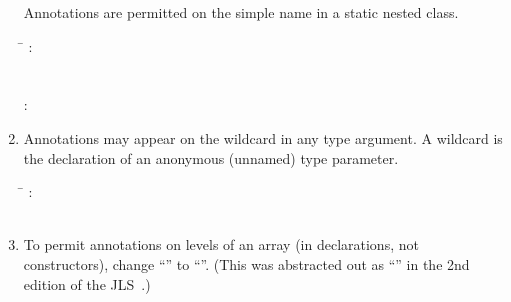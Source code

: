\documentclass[10pt]{article}
\begin{document}
\begin{enumerate}
Annotations are permitted on the simple name in a static nested class.

\begin{tabbing}
\qquad \= \kill
{}: \\
\qquad {} \\
 \\
: \\
\qquad            {}  
\end{tabbing}

\item
Annotations may appear on the wildcard in any type argument.
A wildcard is the declaration of an anonymous (unnamed) type parameter.

\begin{tabbing}
\qquad \= \kill
{}: \\
\qquad            {} \ 
\end{tabbing}


% 


\item
To permit annotations on levels of an array (in declarations, not
constructors), change ``\multi{\term{[]}}''  to
``''.
(This was abstracted out as
``'' in the 2nd edition of the JLS~\cite{GoslingJSB2000}.)


\end{enumerate}
\end{document}
